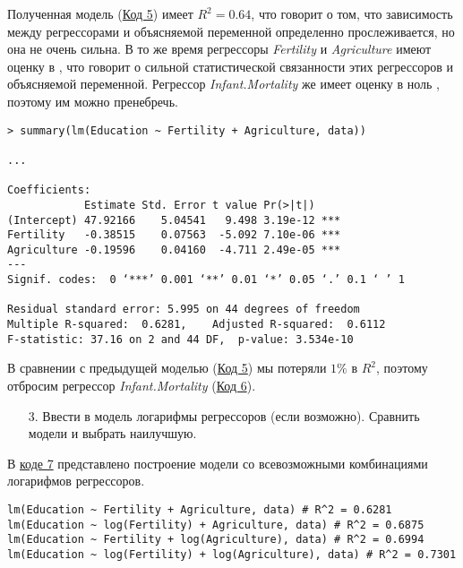 Полученная  модель (\hyperref[code:5]{Код 5}) имеет $R^2 = 0.64$, что говорит о том, что зависимость между регрессорами и объясняемой переменной определенно прослеживается, но она не очень сильна. В то же время регрессоры \textit{Fertility} и \textit{Agriculture} имеют оценку в \textquote{***}, что говорит о сильной статистической связанности этих регрессоров и объясняемой переменной. Регрессор \textit{Infant.Mortality} же имеет оценку в ноль \textquote{*}, поэтому им можно пренебречь.

\begin{code}
\begin{verbatim}
> summary(lm(Education ~ Fertility + Agriculture, data))

...

Coefficients:
            Estimate Std. Error t value Pr(>|t|)    
(Intercept) 47.92166    5.04541   9.498 3.19e-12 ***
Fertility   -0.38515    0.07563  -5.092 7.10e-06 ***
Agriculture -0.19596    0.04160  -4.711 2.49e-05 ***
---
Signif. codes:  0 ‘***’ 0.001 ‘**’ 0.01 ‘*’ 0.05 ‘.’ 0.1 ‘ ’ 1

Residual standard error: 5.995 on 44 degrees of freedom
Multiple R-squared:  0.6281,    Adjusted R-squared:  0.6112 
F-statistic: 37.16 on 2 and 44 DF,  p-value: 3.534e-10
\end{verbatim}
\label{code:6}
\end{code}

В сравнении с предыдущей моделью (\hyperref[code:5]{Код 5}) мы потеряли $1\%$ в $R^2$, поэтому отбросим регрессор \textit{Infant.Mortality} (\hyperref[code:6]{Код 6}).

\begin{enumerate}
    \item[3.] Ввести в модель логарифмы регрессоров (если возможно). Сравнить модели и выбрать наилучшую.
\end{enumerate}

В \hyperref[code:7]{коде 7} представлено построение модели со всевозможными комбинациями логарифмов регрессоров.

\begin{code}
\begin{verbatim}
lm(Education ~ Fertility + Agriculture, data) # R^2 = 0.6281
lm(Education ~ log(Fertility) + Agriculture, data) # R^2 = 0.6875
lm(Education ~ Fertility + log(Agriculture), data) # R^2 = 0.6994
lm(Education ~ log(Fertility) + log(Agriculture), data) # R^2 = 0.7301
\end{verbatim}
\label{code:7}
\end{code}

